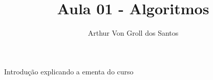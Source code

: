 \documentclass{article}
\author{Arthur Von Groll dos Santos}
\begin{document}
\title{Aula 01 - Algoritmos}
\maketitle

\begin{center}
Introdução explicando a ementa do curso
\end{center}
\end{document}
